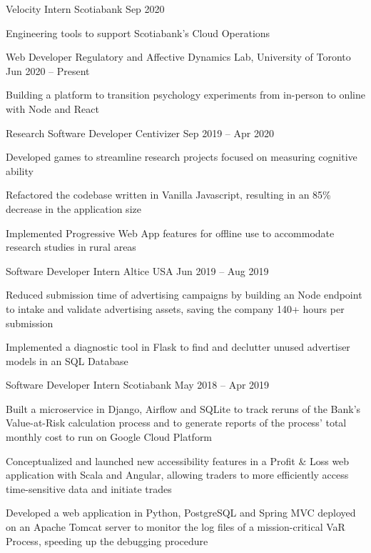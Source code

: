 \begin{cventries}
  \cventry
    {Velocity Intern}
    {Scotiabank}
    {}
    {Sep 2020}
    {}
    {
      \begin{cvitems}
        \item {Engineering tools to support Scotiabank's Cloud Operations}
      \end{cvitems}
    }

  \cventry
    {Web Developer}
    {Regulatory and Affective Dynamics Lab, University of Toronto}
    {}
    {Jun 2020 -- Present}
    {}
    {
      \begin{cvitems}
        \item {Building a platform to transition psychology experiments from in-person to online with Node and React}
      \end{cvitems}
    }

  \cventry
    {Research Software Developer}
    {Centivizer}
    {}
    {Sep 2019 -- Apr 2020}
    {}
    {
      \begin{cvitems}
        \item {Developed games to streamline research projects focused on measuring cognitive ability}
        \item {Refactored the codebase written in Vanilla Javascript, resulting in an 85\% decrease in the application size}
        \item {Implemented Progressive Web App features for offline use to accommodate research studies in rural areas}
      \end{cvitems}
    }

  \cventry
    {Software Developer Intern}
    {Altice USA}
    {}
    {Jun 2019 -- Aug 2019}
    {}
    {
    \begin{cvitems}
      \item {Reduced submission time of advertising campaigns by building an Node endpoint to intake and validate advertising assets, saving the company 140+ hours per submission}
      \item {Implemented a diagnostic tool in Flask to find and declutter unused advertiser models in an SQL Database}
    \end{cvitems}
    }

  \cventry
    {Software Developer Intern}
    {Scotiabank}
    {}
    {May 2018 -- Apr 2019}
    {}
    {
      \begin{cvitems}
        \item {Built a microservice in Django, Airflow and SQLite to track reruns of the Bank's Value-at-Risk calculation process and to generate reports of the process' total monthly cost to run on Google Cloud Platform}
        \item {Conceptualized and launched new accessibility features in a Profit \& Loss web application with Scala and Angular, allowing traders to more efficiently access time-sensitive data and initiate trades}
        \item {Developed a web application in Python, PostgreSQL and Spring MVC deployed on an Apache Tomcat server to monitor the log files of a mission-critical VaR Process, speeding up the debugging procedure}
      \end{cvitems}
    }


\end{cventries}
